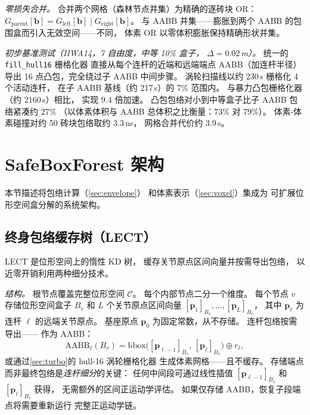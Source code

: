 \documentclass[journal]{IEEEtran}
\newcommand{\Cspace}{\mathcal{C}}
\newcommand{\AABB}{\text{AABB}}
\begin{document}
\emph{零损失合并。}
合并两个网格（森林节点并集）为精确的逐砖块 OR：
$G_{\text{parent}}[\bm{b}] = G_{\text{left}}[\bm{b}] \mathbin{|} G_{\text{right}}[\bm{b}]$。
与 AABB 并集——膨胀到两个 AABB 的包围盒而引入无效空间——不同，
体素 OR 以零体积膨胀保持精确形状并集。

\emph{初步基准测试（IIWA14，7 自由度，中等 10\% 盒子，
$\Delta{=}0.02$\,m）。}
统一的 \texttt{fill\_hull16} 栅格化器
直接从每个连杆的近端和远端端点 AABB（加连杆半径）
导出 16 点凸包，完全绕过子 AABB 中间步骤。
涡轮扫描线以约 230\,\textmu s 栅格化 4 个活动连杆，
在子 AABB 基线（约 217\,\textmu s）的 7\% 范围内。
与暴力凸包栅格化器（约 2160\,\textmu s）相比，
实现 $9.4$ 倍加速。
凸包包络对小到中等盒子比子 AABB 包络紧凑约 27\%
（以体素体积与 AABB 总体积之比衡量：73\% 对 79\%）。
体素-体素碰撞对约 50 砖块包络取约 3.3\,ns，
网格合并代价约 3.9\,\textmu s。

\section{SafeBoxForest 架构}\label{sec:sbf}


本节描述将包络计算（\cref{sec:envelope}）
和体素表示（\cref{sec:voxel}）集成为
可扩展位形空间盒分解的系统架构。

\subsection{终身包络缓存树（LECT）}\label{sec:lect}

LECT 是位形空间上的惰性 KD 树，
缓存关节原点区间向量并按需导出包络，
以近零开销利用两种细分技术。

\emph{结构。}
根节点覆盖完整位形空间 $\Cspace$。
每个内部节点二分一个维度。
每个节点 $v$ 存储位形空间盒子 $B_v$
和 $L$ 个关节原点区间向量
$[\bm{p}_1]_{B_v},\ldots,[\bm{p}_L]_{B_v}$，
其中 $\bm{p}_\ell$ 为连杆 $\ell$ 的远端关节原点。
基座原点 $\bm{p}_0$ 为固定常数，从不存储。
连杆包络按需导出——
作为 AABB：
\begin{equation}\label{eq:lect_aabb}
  \AABB_\ell(B_v)=\mathrm{bbox}\!\bigl([\bm{p}_{\ell-1}]_{B_v},\,[\bm{p}_\ell]_{B_v}\bigr)\oplus r_\ell,
\end{equation}
或通过\cref{sec:turbo}的 hull-16 涡轮栅格化器
生成体素网格——且不缓存。
存储端点而非最终包络是\emph{连杆细分}的关键：
任何中间段可通过线性插值
$[\bm{p}_{\ell-1}]_{B_v}$ 和 $[\bm{p}_\ell]_{B_v}$ 获得，
无需额外的区间正运动学评估。
如果仅存储 AABB，恢复子段端点将需要重新运行
完整正运动学链。
\end{document}
